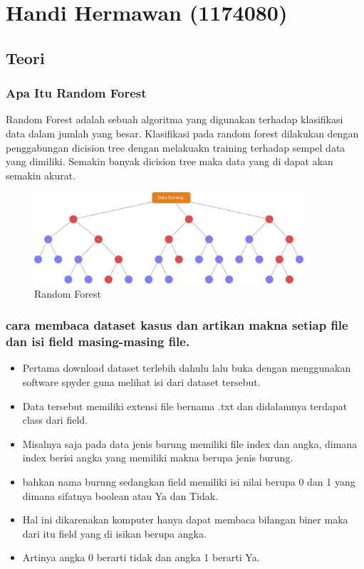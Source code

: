 \section{Handi Hermawan (1174080)}
\subsection{Teori}

\subsubsection{Apa Itu Random Forest}

\hfill\break
Random Forest adalah sebuah algoritma yang digunakan terhadap klasifikasi data dalam jumlah yang besar. Klasifikasi pada random forest dilakukan dengan penggabungan dicision tree dengan melakuakn training terhadap sempel data yang dimiliki. Semakin banyak dicision tree maka data yang di dapat akan
semakin akurat.
\begin{figure}[H]
\centerline{\includegraphics[width=10cm]{figures/1174080/3/1.jpg}}
\caption{Random Forest}
\label{labelgambar}
\end{figure}

\subsubsection{cara membaca dataset kasus dan artikan makna setiap file dan isi field masing-masing file.}

\hfill\break
\begin{itemize}
\item Pertama download dataset terlebih dahulu lalu buka dengan menggunakan software spyder guna melihat isi dari dataset tersebut.

\item Data tersebut memiliki extensi file bernama .txt dan didalamnya terdapat class dari field.

\item Misalnya saja pada data jenis burung memiliki file index dan angka, dimana index berisi angka yang memiliki makna berupa jenis burung.

\item bahkan nama burung sedangkan field memiliki isi nilai berupa 0 dan 1 yang dimana sifatnya boolean atau Ya dan Tidak.

\item Hal ini dikarenakan komputer hanya dapat membaca bilangan biner maka dari itu field yang di isikan berupa angka.

\item Artinya angka 0 berarti tidak dan angka 1 berarti Ya.
\end{itemize}

